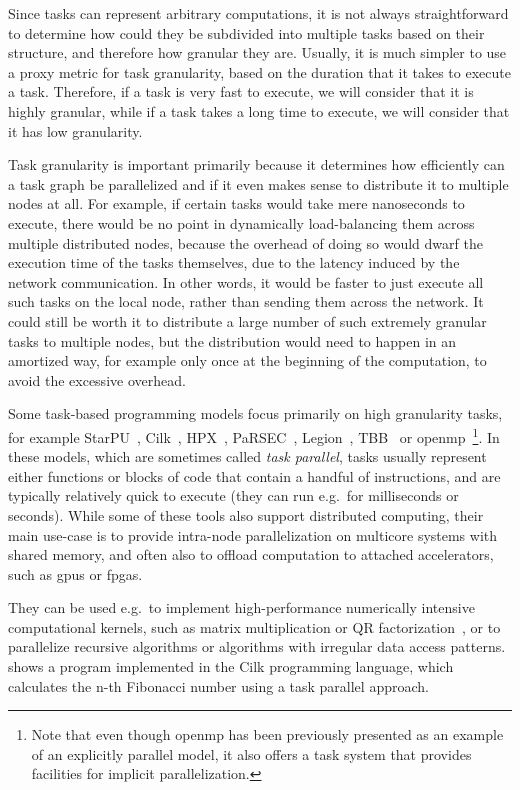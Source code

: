 Since tasks can represent arbitrary computations, it is not always straightforward to determine how
could they be subdivided into multiple tasks based on their structure, and therefore how granular
they are. Usually, it is much simpler to use a proxy metric for task granularity, based on the
duration that it takes to execute a task. Therefore, if a task is very fast to execute, we will
consider that it is highly granular, while if a task takes a long time to execute, we will consider
that it has low granularity.

Task granularity is important primarily because it determines how efficiently can a task graph be
parallelized and if it even makes sense to distribute it to multiple nodes at all. For example, if
certain tasks would take mere nanoseconds to execute, there would be no point in dynamically
load-balancing them across multiple distributed nodes, because the overhead of doing so would dwarf
the execution time of the tasks themselves, due to the latency induced by the network
communication. In other words, it would be faster to just execute all such tasks on the local node,
rather than sending them across the network. It could still be worth it to distribute a large
number of such extremely granular tasks to multiple nodes, but the distribution would need to
happen in an amortized way, for example only once at the beginning of the computation, to avoid the
excessive overhead.

Some task-based programming models focus primarily on high granularity tasks, for example
StarPU~\cite{starpu}, Cilk~\cite{cilk},
HPX~\cite{hpx}, PaRSEC~\cite{parsec},
Legion~\cite{legion}, TBB~\cite{tbb} or
\gls{openmp}~\cite{openmp}\footnote{Note that even though \gls{openmp} has been previously presented as an example of an
explicitly parallel model, it also offers a task system that provides facilities for implicit parallelization.}. In these
models, which are sometimes called \emph{task parallel}, tasks usually represent either
functions or blocks of code that contain a handful of instructions, and are typically relatively
quick to execute (they can run e.g.\ for milliseconds or seconds). While some of these tools also
support distributed computing, their main use-case is to provide intra-node parallelization on
multicore systems with shared memory, and often also to offload computation to attached
accelerators, such as \glspl{gpu} or \glspl{fpga}.

They can be used e.g.\ to implement high-performance numerically intensive computational kernels,
such as matrix multiplication or QR factorization~\cite{qr_factorization}, or to parallelize
recursive algorithms or algorithms with irregular data access patterns. 
shows a program implemented in the Cilk programming language, which calculates the n-th Fibonacci
number using a task parallel approach.

